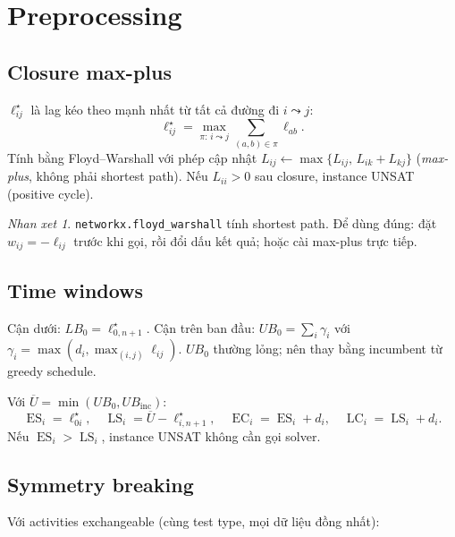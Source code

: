 \documentclass[11pt,a4paper]{article}
\theoremstyle{remark}
\newtheorem{remark}[theorem]{Nhan xet}
\newcommand{\ES}{\operatorname{ES}}
\newcommand{\LS}{\operatorname{LS}}
\newcommand{\EC}{\operatorname{EC}}
\newcommand{\LC}{\operatorname{LC}}
\begin{document}
\section{Preprocessing}
\label{sec:preprocessing}

\subsection{Closure max-plus}

$\ell^\star_{ij}$ là lag kéo theo mạnh nhất từ tất cả đường đi $i \leadsto j$:
\[
  \ell^\star_{ij} = \max_{\pi:\,i\leadsto j} \sum_{(a,b)\in\pi} \ell_{ab}.
\]
Tính bằng Floyd--Warshall với phép cập nhật
$L_{ij} \leftarrow \max\{L_{ij},\, L_{ik} + L_{kj}\}$ (\emph{max-plus},
không phải shortest path).
Nếu $L_{ii} > 0$ sau closure, instance UNSAT (positive cycle).

\begin{remark}
\texttt{networkx.floyd\_warshall} tính shortest path.
Để dùng đúng: đặt $w_{ij} = -\ell_{ij}$ trước khi gọi, rồi đổi dấu kết quả;
hoặc cài max-plus trực tiếp.
\end{remark}

\subsection{Time windows}

Cận dưới: $LB_0 = \ell^\star_{0,n+1}$.
Cận trên ban đầu: $UB_0 = \sum_i \gamma_i$ với $\gamma_i = \max(d_i, \max_{(i,j)}\ell_{ij})$.
$UB_0$ thường lỏng; nên thay bằng incumbent từ greedy schedule.

Với $\overline{U} = \min(UB_0, UB_\mathrm{inc})$:
\begin{equation}
  \ES_i = \ell^\star_{0i},\quad \LS_i = \overline{U} - \ell^\star_{i,n+1},\quad
  \EC_i = \ES_i + d_i,\quad \LC_i = \LS_i + d_i.
  \label{eq:windows}
\end{equation}
Nếu $\ES_i > \LS_i$, instance UNSAT không cần gọi solver.

\subsection{Symmetry breaking}
\label{sec:sb}

Với activities exchangeable (cùng test type, mọi dữ liệu đồng nhất):
\end{document}
